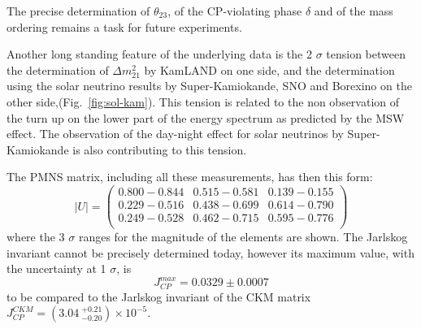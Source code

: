The precise determination of $\theta_{23}$, of the CP-violating phase $\delta$ and of the mass ordering remains a task for future experiments.

Another long standing feature of the underlying data is the 2 $\sigma$ tension between the determination of $\Delta m^2_{21}$ by KamLAND on one side, and the determination using the solar neutrino results by Super-Kamiokande, SNO and Borexino on the other side,(Fig.~\ref{fig:sol-kam}).
This tension is related to the non observation of the turn up on the lower part of the energy spectrum as predicted by the MSW effect. The observation of the day-night effect for solar neutrinos by Super-Kamiokande is also contributing to this tension.

The PMNS matrix, including all these measurements, has then this form: 
\begin{equation}
|U| = \begin{pmatrix}
0.800 - 0.844 & 0.515 - 0.581 & 0.139 - 0.155 \\
0.229 - 0.516 & 0.438 - 0.699 & 0.614 - 0.790 \\
0.249 - 0.528 & 0.462 - 0.715 & 0.595 - 0.776 \\
\end{pmatrix}
\end{equation}
where the 3 $\sigma$ ranges for the magnitude of the elements are shown.
The Jarlskog invariant cannot be precisely determined today, however its maximum value, with the uncertainty at 1 $\sigma$, is 
\begin{equation}
J_{CP}^{max}
= 0.0329 \pm 0.0007 
\end{equation}
to be compared to the Jarlskog invariant of the CKM matrix
$J_{CP}^{CKM} = (3.04 \: {}^{+0.21} _{−0.20} ) \times 10^{-5}$.


